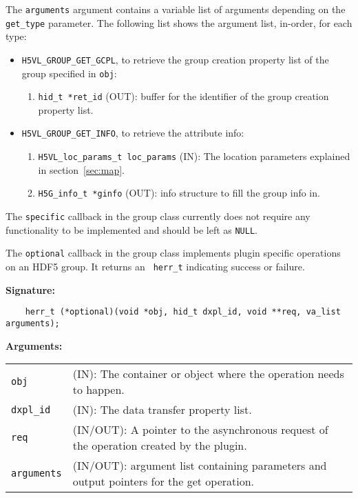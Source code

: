 The {\tt arguments} argument contains a variable list of arguments
depending on the {\tt get\_type} parameter. The following list shows
the argument list, in-order, for each type:

\begin{itemize}
\item {\tt H5VL\_GROUP\_GET\_GCPL}, to retrieve the group creation
  property list of the group specified in {\tt obj}:
  \begin{enumerate}
  \item {\tt hid\_t *ret\_id} (OUT): buffer for the identifier of the
    group creation property list.
  \end{enumerate}

\item {\tt H5VL\_GROUP\_GET\_INFO}, to retrieve the attribute info:
  \begin{enumerate}
  \item {\tt H5VL\_loc\_params\_t loc\_params} (IN): The location parameters
    explained in section~\ref{sec:map}. 
  \item {\tt H5G\_info\_t *ginfo} (OUT): info structure to fill the
    group info in.
  \end{enumerate}
\end{itemize}

The {\tt specific} callback in the group class currently does not require any functionality to be implemented and should be left as {\tt NULL}.

The {\tt optional} callback in the group class implements plugin specific operations on an HDF5 group. It returns an {\tt
  herr\_t} indicating success or failure. 

\textbf{Signature:}
\begin{lstlisting}
    herr_t (*optional)(void *obj, hid_t dxpl_id, void **req, va_list arguments);
\end{lstlisting}

\textbf{Arguments:}\\
\begin{tabular}{l p{10cm}}
  {\tt obj} & (IN): The container or object where the operation needs to happen.\\
  {\tt dxpl\_id} & (IN): The data transfer property list.\\
  {\tt req} & (IN/OUT): A pointer to the asynchronous request of the operation created by the plugin.\\
  {\tt arguments} & (IN/OUT): argument list containing parameters and output pointers for the get operation. \\
\end{tabular}

